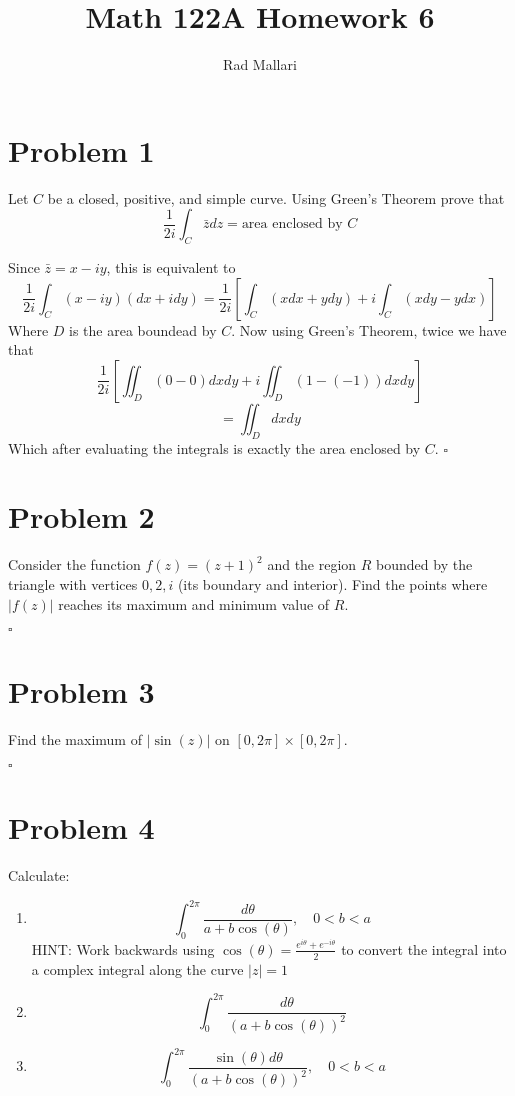 \documentclass[12pt]{article}
\title{Math 122A Homework 6}
\author{Rad Mallari}
\newenvironment{proof}{\noindent{\bf Proof.}}{\hfill $\square$\medskip}
\begin{document}
\maketitle

\section{Problem 1}
Let $C$ be a closed, positive, and simple curve. Using Green's Theorem prove that
$$\frac{1}{2i}\int_{C}\bar{z}dz=\text{area enclosed by }C$$

\begin{proof}
    Since $\bar{z}=x-iy$, this is equivalent to
    $$\frac{1}{2i}\int_{C}(x-iy)(dx+idy)=\frac{1}{2i}\left [\int_{C}(xdx+ydy)+i\int_{C}(xdy-ydx)\right ]$$
    Where $D$ is the area boundead by $C$. Now using Green's Theorem, twice we have that
    $$\frac{1}{2i}\left[\iint_{D}(0-0)dxdy+i\iint_{D}(1-(-1))dxdy\right]$$
    $$=\iint_{D}dxdy$$
    Which after evaluating the integrals is exactly the area enclosed by $C$.
\end{proof}


\section{Problem 2}
Consider the function $f(z)=(z+1)^{2}$ and the region $R$ bounded by the triangle with vertices $0,2,i$ (its boundary and interior). Find the points where $\left |f(z)\right |$ reaches its maximum and minimum value of $R$.

\begin{proof}

\end{proof}


\section{Problem 3}
Find the maximum of $\left |\sin(z)\right |$ on $[0,2\pi]\times[0,2\pi]$.

\begin{proof}

\end{proof}


\section{Problem 4}
Calculate:
\begin{enumerate}[label=\textbf{(\alph*)}]
    \item $$\int_{0}^{2\pi}\frac{d\theta}{a+b\cos(\theta)},\quad 0<b<a$$
          HINT: Work backwards using $\cos(\theta)=\frac{e^{i\theta}+e^{-i\theta}}{2}$ to convert the integral into a complex integral along the curve $\left |z\right |=1$
    \item $$\int_{0}^{2\pi}\frac{d\theta}{(a+b\cos(\theta))^{2}}$$
    \item $$\int_{0}^{2\pi}\frac{\sin(\theta)d\theta}{(a+b\cos(\theta))^{2}},\quad 0<b<a$$
\end{enumerate}
\end{document}
